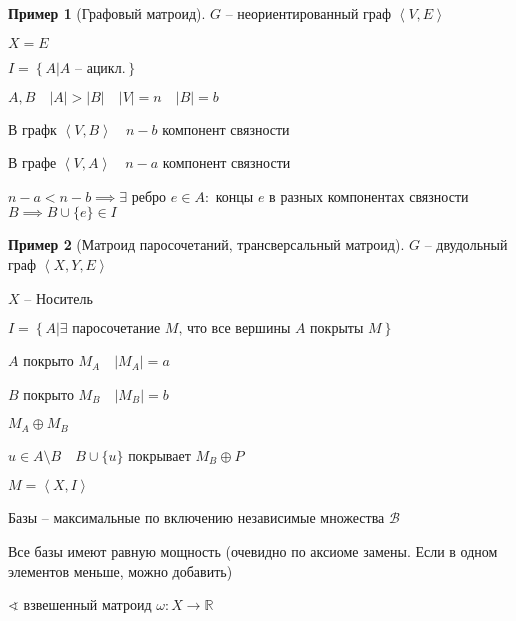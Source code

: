 \documentclass{book}
\newcommand\R{\ensuremath{\mathbb{R}}}
\theoremstyle{definition}
\newtheorem*{example}{Пример}
\begin{document}
\begin{example}
    [Графовый матроид]

    $G$ -- неориентированный граф  $\left<V, E \right>$ 

    $X = E$

     $I = \left\{ A| A \text{ -- ацикл.} \right\} $ 

     $A, B\quad |A| > |B|\quad |V| = n\quad |B| = b$ 

     В графк $\left<V, B \right>\quad n-b$ компонент связности

     В графе $\left<V, A \right>\quad n-a$ компонент связности

     $n-a < n-b \implies \exists $ ребро $e\in A:$ концы  $e$ в разных компонентах связности  $B \implies B \cup \{e\}\in I$
\end{example}

\begin{example}
    [Матроид паросочетаний, трансверсальный матроид]

    $G$ -- двудольный граф  $\left<X, Y, E \right>$

    $X$ -- Носитель

     $I = \left\{ A| \exists \text{ паросочетание } M \text{, что все вершины } A \text{ покрыты } M \right\} $ 

     $A$ покрыто  $M_A\quad |M_A| = a$

     $B$ покрыто  $M_B\quad |M_B| = b$ 

     $M_A \oplus M_B$

     $u\in A\setminus B\quad B \cup \{u\}$ покрывает $M_B\oplus P$
\end{example}

$M = \left<X, I \right>$

Базы -- максимальные по включению независимые множества $\mathcal B$

 \begin{lemma}
     Все базы имеют равную мощность (очевидно по аксиоме замены. Если в одном элементов меньше, можно добавить)
\end{lemma}

$\sphericalangle $ взвешенный матроид $\omega: X \to \R$
\end{document}
